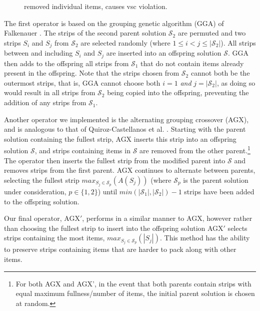 \documentclass{elsarticle}
\begin{document}
\begin{figure}[H]	
	\centering
	
	\caption{removed individual items, causes vsc violation.}	
	\label{fig:eavsc}
\end{figure}

The first operator is based on the grouping genetic algorithm (GGA) of Falkenauer \cite{falkenauer1992}. The strips of the second parent solution $\mathcal{S}_2$ are permuted and two strips $S_i$ and $S_j$ from $\mathcal{S}_2$ are selected randomly (where $1 \leq i < j \leq |\mathcal{S}_2|$). All strips between and including $S_i$ and $S_j$ are inserted into an offspring solution $\mathcal{S}$. GGA then adds to the offspring all strips from $\mathcal{S}_1$ that do not contain items already present in the offspring. Note that the strips chosen from $\mathcal{S}_2$ cannot both be the outermost strips, that is, GGA cannot choose both $i = 1$ \emph{and} $j = |\mathcal{S}_2|$, as doing so would result in all strips from $\mathcal{S}_2$ being copied into the offspring, preventing the addition of any strips from $\mathcal{S}_1$. 

Another operator we implemented is the alternating grouping crossover (AGX), and is analogous to that of Quiroz-Castellanos et al. \cite{quiroz2015}. Starting with the parent solution containing the fullest strip, AGX inserts this strip into an offspring solution $\mathcal{S}$, and strips containing items in $\mathcal{S}$ are removed from the other parent.\footnote{For both AGX and AGX', in the event that both parents contain strips with equal maximum fullness/number of items, the initial parent solution is chosen at random.} The operator then inserts the fullest strip from the modified parent into $\mathcal{S}$ and removes strips from the first parent. AGX continues to alternate between parents, selecting the fullest strip $max_{S_j \in \mathcal{S}_p} (A(S_j))$ (where $\mathcal{S}_p$ is the parent solution under consideration, $p \in \{1,2\}$) until $min (|\mathcal{S}_1|,|\mathcal{S}_2|) - 1$ strips have been added to the offspring solution. 

Our final operator, AGX$'$, performs in a similar manner to AGX, however rather than choosing the fullest strip to insert into the offspring solution AGX$'$ selects strips containing the most items, $max_{S_j \in \mathcal{S}_p} (|S_j|)$. This method has the ability to preserve strips containing items that are harder to pack along with other items. 
\end{document}

